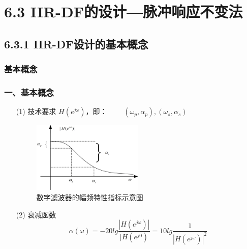 \documentclass[notheorems,compress,mathserif,table]{beamer}
\begin{document}
\section{6.3 IIR-DF的设计—脉冲响应不变法}

\subsection{6.3.1 IIR-DF设计的基本概念}
\subsubsection{基本概念}
\begin{frame}[shrink]\frametitle{一、基本概念}%
\begin{enumerate}
  \item [(1)]
    技术要求 $H(e^{j\omega})$，即：    $\quad\quad(\omega_p,\alpha_p),(\omega_s,\alpha_s)$
    \begin{figure}[h]
    \centering
    \includegraphics[width=0.5\textwidth]{fig9_lpdfjszb.jpg}
    \caption{数字滤波器的幅频特性指标示意图}
    \end{figure}
  \item [(2)] 衰减函数
  $$\alpha(\omega)=-20lg\frac{|H(e^{j\omega})|}{|H(e^{j0})}= 10lg\frac{1}{|H(e^{j\omega})|^2}$$
\end{enumerate}
\end{frame}
%
%
\end{document}
